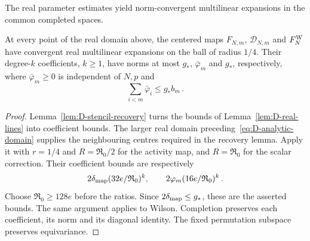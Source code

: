 The real parameter estimates yield norm-convergent multilinear expansions in the common completed spaces.
\begin{lemma}\label{lem:D-analytic-step}
At every point of the real domain above, the centered maps $F_{N,m}$, $\mathcal D_{N,m}$ and $F_N^{\rm W}$ have convergent real multilinear expansions on the ball of radius $1/4$. Their degree-$k$ coefficients, $k\ge1$, have norms at most $g_*$, $\bar\varphi_m$ and $g_*$, respectively, where $\bar\varphi_m\ge0$ is independent of $N,p$ and
\begin{equation*}
\sum_{i<m}\bar\varphi_i\le g_*b_m\,.
\end{equation*}
\end{lemma}
\begin{proof}
Lemma~\ref{lem:D-stencil-recovery} turns the bounds of Lemma~\ref{lem:D-real-lines} into coefficient bounds. The larger real domain preceding~\eqref{eq:D-analytic-domain} supplies the neighbouring centres required in the recovery lemma. Apply it with $r=1/4$ and $R=\mathfrak R_0/2$ for the activity map, and $R=\mathfrak R_0$ for the scalar correction. Their coefficient bounds are respectively
\begin{equation*}
2\delta_{\rm map}(32e/\mathfrak R_0)^k,\qquad
2\varphi_m(16e/\mathfrak R_0)^k\,.
\end{equation*}
Choose $\mathfrak R_0\ge128e$ before the ratios. Since $2\delta_{\rm map}\le g_*$, these are the asserted bounds. The same argument applies to Wilson. Completion preserves each coefficient, its norm and its diagonal identity. The fixed permutation subspace preserves equivariance.
\end{proof}

